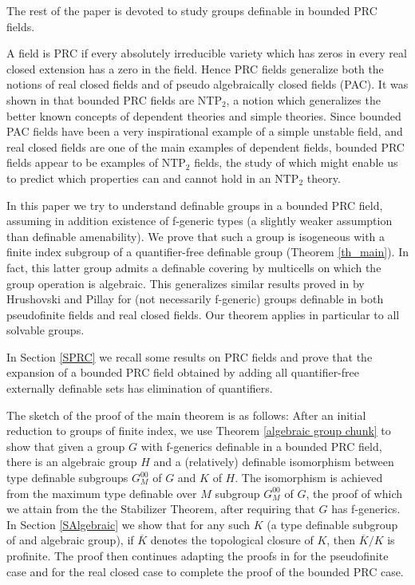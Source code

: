 \documentclass[12pt]{article}
\theoremstyle{definition}
\theoremstyle{mystyle}
\theoremstyle{remark}
\begin{document}
The rest of the paper is devoted to study groups definable in
bounded PRC fields.

A field is PRC if every absolutely irreducible variety which has
zeros in every real closed extension has a zero in the field.
Hence PRC fields generalize both the notions of real closed fields
and of pseudo algebraically closed fields (PAC). It was shown in
\cite{Mon} that bounded PRC fields are NTP$_2$, a notion which
generalizes the better known concepts of dependent theories and
simple theories.   Since bounded PAC fields have been a very
inspirational example of a simple unstable field,  and real closed
fields are one of the main examples of dependent fields, bounded
PRC fields appear to be examples of NTP$_2$ fields, the study of
which might enable us to predict which properties can and cannot
hold in an NTP$_2$ theory.

In this paper we try to understand definable groups in a bounded
PRC field, assuming in addition existence of f-generic types (a
slightly weaker assumption than definable amenability). We prove
that such a group is isogeneous with a finite index subgroup of a
quantifier-free definable group (Theorem \ref{th_main}). In fact,
this latter group admits a definable covering by multicells on
which the group operation is algebraic. This generalizes similar
results proved in \cite{HrPi} by Hrushovski and Pillay for (not
necessarily f-generic) groups definable in both pseudofinite
fields and real closed fields. Our theorem applies in particular
to all solvable groups.

In Section \ref{SPRC} we recall some results on PRC fields and
prove that the expansion of a bounded PRC field obtained by adding
all quantifier-free externally definable sets has elimination of
quantifiers.

The sketch of the proof of the main theorem is as follows: After
an initial reduction to groups of finite index, we use Theorem
\ref{algebraic group chunk} to show that given a group $G$ with
f-generics definable in a bounded PRC field, there is an algebraic
group $H$ and a (relatively) definable isomorphism between type
definable subgroups $G^{00}_M$ of $G$ and $K$ of $H$. The
isomorphism is achieved from the maximum type definable over $M$
subgroup $G^{00}_M$ of $G$, the proof of which we attain from the
the Stabilizer Theorem, after requiring that $G$ has f-generics.
In Section \ref{SAlgebraic} we show that for any such $K$ (a type
definable subgroup of and algebraic group), if $\overline{K}$
denotes the topological closure of  $K$, then $\overline{K}/K$ is
profinite. The proof then continues adapting the proofs in
\cite{HrPi} for the pseudofinite case and for the real closed case
to complete the proof of the bounded PRC case.
\end{document}

